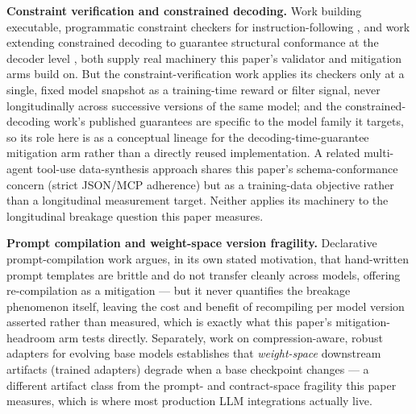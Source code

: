 \documentclass[11pt]{article}
\begin{document}
\textbf{Constraint verification and constrained decoding.} Work building executable, programmatic constraint checkers for instruction-following \citep{RECAST,AutoIF}, and work extending constrained decoding to guarantee structural conformance at the decoder level \citep{DiffusionCFG}, both supply real machinery this paper's validator and mitigation arms build on. But the constraint-verification work applies its checkers only at a single, fixed model snapshot as a training-time reward or filter signal, never longitudinally across successive versions of the same model; and the constrained-decoding work's published guarantees are specific to the model family it targets, so its role here is as a conceptual lineage for the decoding-time-guarantee mitigation arm rather than a directly reused implementation. A related multi-agent tool-use data-synthesis approach \citep{CloseLoopSynthesizing3611} shares this paper's schema-conformance concern (strict JSON/MCP adherence) but as a training-data objective rather than a longitudinal measurement target. Neither applies its machinery to the longitudinal breakage question this paper measures.

\textbf{Prompt compilation and weight-space version fragility.} Declarative prompt-compilation work \citep{DSPy} argues, in its own stated motivation, that hand-written prompt templates are brittle and do not transfer cleanly across models, offering re-compilation as a mitigation --- but it never quantifies the breakage phenomenon itself, leaving the cost and benefit of recompiling per model version asserted rather than measured, which is exactly what this paper's mitigation-headroom arm tests directly. Separately, work on compression-aware, robust adapters for evolving base models \citep{CARLoRA} establishes that \emph{weight-space} downstream artifacts (trained adapters) degrade when a base checkpoint changes --- a different artifact class from the prompt- and contract-space fragility this paper measures, which is where most production LLM integrations actually live.
\end{document}
